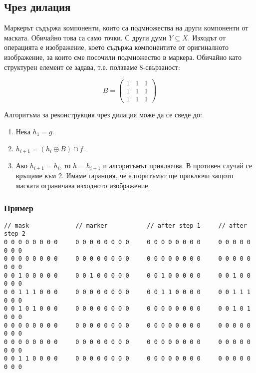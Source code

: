 \documentclass[fleqn,12pt]{article}
\begin{document}
\subsection{Чрез дилация}

Маркерът съдържа компоненти, които са подмножества на други компоненти от маската. Обичайно това са само точки. С други думи $Y \subseteq X$. Изходът от операцията е изображение, което съдържа компонентите от оригиналното изображение, за които сме посочили подмножество в маркера. Обичайно като структурен елемент се задава, т.е. ползваме 8-свързаност:

\begin{equation}
    B = \begin{pmatrix}
    1 & 1 & 1 \\
    1 & 1 & 1 \\
    1 & 1 & 1
    \end{pmatrix}
\end{equation}

Алгоритъма за реконструкция чрез дилация може да се сведе до:
\begin{enumerate}
    \item Нека $h_1 = g$.
    \item $h_{i+1} = (h_{i} \oplus B) \cap f$.
    \item Ако $h_{i+1} = h_i$, то $h = h_{i+1}$ и алгоритъмът приключва. В противен случай се връщаме към 2. Имаме гаранция, че алгоритъмът ще приключи защото маската ограничава изходното изображение.
\end{enumerate}

\subsubsection{Пример}

\begin{lstlisting}[caption=Example for reconstruction based on dilation]
// mask             // marker           // after step 1     // after step 2
0 0 0 0 0 0 0 0     0 0 0 0 0 0 0 0     0 0 0 0 0 0 0 0     0 0 0 0 0 0 0 0
0 0 0 0 0 0 0 0     0 0 0 0 0 0 0 0     0 0 0 0 0 0 0 0     0 0 0 0 0 0 0 0
0 0 1 0 0 0 0 0     0 0 1 0 0 0 0 0     0 0 1 0 0 0 0 0     0 0 1 0 0 0 0 0 
0 0 1 1 1 0 0 0     0 0 0 0 0 0 0 0     0 0 1 1 0 0 0 0     0 0 1 1 1 0 0 0
0 0 1 0 1 0 0 0     0 0 0 0 0 0 0 0     0 0 0 0 0 0 0 0     0 0 1 0 1 0 0 0
0 0 0 0 0 0 0 0     0 0 0 0 0 0 0 0     0 0 0 0 0 0 0 0     0 0 0 0 0 0 0 0
0 0 0 0 0 0 0 0     0 0 0 0 0 0 0 0     0 0 0 0 0 0 0 0     0 0 0 0 0 0 0 0
0 0 1 1 0 0 0 0     0 0 0 0 0 0 0 0     0 0 0 0 0 0 0 0     0 0 0 0 0 0 0 0
\end{lstlisting}
\end{document}
